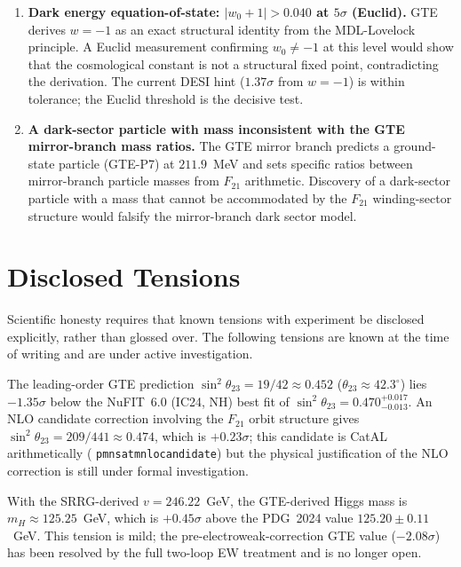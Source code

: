 \documentclass[11pt,openany]{book}
\theoremstyle{remark}
\newcommand{\lean}[1]{%
  \penalty-100
  \begingroup\def\_{\textunderscore\allowbreak}\texttt{#1}\endgroup}
\begin{document}
\begin{appendices}
\begin{tcolorbox}[colback=orange!5,colframe=orange!60,title={Five Observations That Would Definitively Falsify GTE},breakable]
\begin{enumerate}[leftmargin=*,itemsep=6pt]
\item \textbf{Dark energy equation-of-state: $|w_0+1| > 0.040$ at $5\sigma$ (Euclid).}
GTE derives $w=-1$ as an exact structural identity from the MDL-Lovelock principle.
A Euclid measurement confirming $w_0\neq -1$ at this level would show that the
cosmological constant is not a structural fixed point, contradicting the derivation.
The current DESI hint ($1.37\sigma$ from $w=-1$) is within tolerance; the Euclid
threshold is the decisive test.

\item \textbf{A dark-sector particle with mass inconsistent with the GTE mirror-branch
mass ratios.}
The GTE mirror branch predicts a ground-state particle (GTE-P7) at $211.9$~MeV and
sets specific ratios between mirror-branch particle masses from $F_{21}$ arithmetic.
Discovery of a dark-sector particle with a mass that cannot be accommodated by the
$F_{21}$ winding-sector structure would falsify the mirror-branch dark sector model.

\end{enumerate}
\end{tcolorbox}

\section*{Disclosed Tensions}

Scientific honesty requires that known tensions with experiment be disclosed
explicitly, rather than glossed over.
The following tensions are known at the time of writing and are under active
investigation.

\begin{description}[leftmargin=*,itemsep=4pt]

\item[$\sin^2\theta_{23}$ ($-1.35\sigma$, LO).]
The leading-order GTE prediction $\sin^2\theta_{23}=19/42\approx0.452$
($\theta_{23}\approx42.3^\circ$) lies $-1.35\sigma$ below the NuFIT~6.0 (IC24, NH)
best fit of $\sin^2\theta_{23}=0.470^{+0.017}_{-0.013}$.
An NLO candidate correction involving the $F_{21}$ orbit structure gives
$\sin^2\theta_{23}=209/441\approx0.474$, which is $+0.23\sigma$; this candidate
is CatAL arithmetically (\lean{pmns\_atm\_nlo\_candidate}) but the physical
justification of the NLO correction is still under formal investigation.

\item[$m_H$ Higgs mass ($+0.45\sigma$, with self-consistent VEV).]
With the SRRG-derived $v=246.22$~GeV, the GTE-derived Higgs mass is
$m_H\approx125.25$~GeV, which is $+0.45\sigma$ above the PDG~2024 value
$125.20\pm0.11$~GeV.
This tension is mild; the pre-electroweak-correction GTE value ($-2.08\sigma$)
has been resolved by the full two-loop EW treatment and is no longer open.


\end{description}
\end{appendices}
\end{document}

